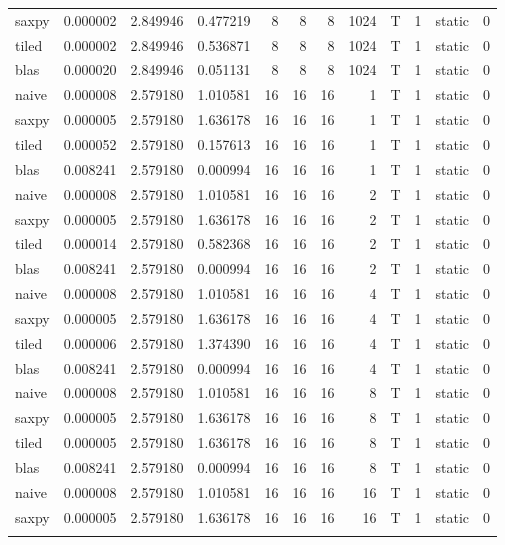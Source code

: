 \documentclass[
  12pt,
  xcolor = usenames,dvipsnames]{article}
\begin{document}
\begin{table}[!h]
{\begin{tabular}[t]{lrrrrrrrlrlr}
saxpy & 0.000002 & 2.849946 & 0.477219 & 8 & 8 & 8 & 1024 & T & 1 & static & 0\\
\addlinespace
tiled & 0.000002 & 2.849946 & 0.536871 & 8 & 8 & 8 & 1024 & T & 1 & static & 0\\
blas & 0.000020 & 2.849946 & 0.051131 & 8 & 8 & 8 & 1024 & T & 1 & static & 0\\
naive & 0.000008 & 2.579180 & 1.010581 & 16 & 16 & 16 & 1 & T & 1 & static & 0\\
saxpy & 0.000005 & 2.579180 & 1.636178 & 16 & 16 & 16 & 1 & T & 1 & static & 0\\
tiled & 0.000052 & 2.579180 & 0.157613 & 16 & 16 & 16 & 1 & T & 1 & static & 0\\
\addlinespace
blas & 0.008241 & 2.579180 & 0.000994 & 16 & 16 & 16 & 1 & T & 1 & static & 0\\
naive & 0.000008 & 2.579180 & 1.010581 & 16 & 16 & 16 & 2 & T & 1 & static & 0\\
saxpy & 0.000005 & 2.579180 & 1.636178 & 16 & 16 & 16 & 2 & T & 1 & static & 0\\
tiled & 0.000014 & 2.579180 & 0.582368 & 16 & 16 & 16 & 2 & T & 1 & static & 0\\
blas & 0.008241 & 2.579180 & 0.000994 & 16 & 16 & 16 & 2 & T & 1 & static & 0\\
\addlinespace
naive & 0.000008 & 2.579180 & 1.010581 & 16 & 16 & 16 & 4 & T & 1 & static & 0\\
saxpy & 0.000005 & 2.579180 & 1.636178 & 16 & 16 & 16 & 4 & T & 1 & static & 0\\
tiled & 0.000006 & 2.579180 & 1.374390 & 16 & 16 & 16 & 4 & T & 1 & static & 0\\
blas & 0.008241 & 2.579180 & 0.000994 & 16 & 16 & 16 & 4 & T & 1 & static & 0\\
naive & 0.000008 & 2.579180 & 1.010581 & 16 & 16 & 16 & 8 & T & 1 & static & 0\\
\addlinespace
saxpy & 0.000005 & 2.579180 & 1.636178 & 16 & 16 & 16 & 8 & T & 1 & static & 0\\
tiled & 0.000005 & 2.579180 & 1.636178 & 16 & 16 & 16 & 8 & T & 1 & static & 0\\
blas & 0.008241 & 2.579180 & 0.000994 & 16 & 16 & 16 & 8 & T & 1 & static & 0\\
naive & 0.000008 & 2.579180 & 1.010581 & 16 & 16 & 16 & 16 & T & 1 & static & 0\\
saxpy & 0.000005 & 2.579180 & 1.636178 & 16 & 16 & 16 & 16 & T & 1 & static & 0\\
\addlinespace

\end{tabular}}
\end{table}
\end{document}
